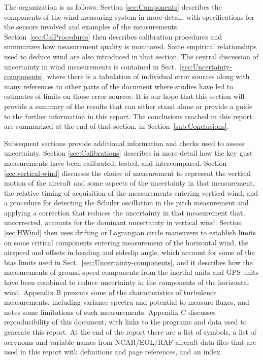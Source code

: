 \documentclass[12pt,twoside,english]{article}\usepackage[]{graphicx}\usepackage[]{color}
\let\OrgIndex\index
\renewcommand*{\index}[1]{\OrgIndex{#1}}
\begin{document}
The organization is as follows: Section \ref{sec:Components} describes the components of the wind-measuring system in more detail, with specifications for the sensors involved and examples of the measurements. Section~\ref{sec:CalProcedures} then describes calibration procedures and summarizes how measurement quality is monitored. Some empirical relationships used to deduce wind are also introduced in that section. The central discussion of uncertainty in wind measurements is contained in Sect.~\ref{sec:Uncertainty-components}, where there is a tabulation of individual error sources along with many references to other parts of the document where studies have led to estimates of limits on those error sources. It is our hope that this section will provide a summary of the results that can either stand alone or provide a guide to the further information in this report. The conclusions reached in this report are summarized at the end of that section, in Section~\ref{sub:Conclusions}.

Subsequent sections provide additional information and checks used to assess uncertainty. Section \ref{sec:Calibrations} describes in more detail how the key gust measurements have been calibrated, tested, and intercompared. Section \ref{sec:vertical-wind} discusses the choice of measurement to represent the vertical motion of the aircraft and some aspects of the uncertainty in that measurement, the relative timing of acquisition of the measurements entering vertical wind, and a procedure for detecting the Schuler oscillation in the pitch measurement and applying a correction that reduces the uncertainty in that measurement that, uncorrected, accounts for the dominant uncertainty in vertical wind. Section \ref{sec:HWind} then uses drifting or Lagrangian circle maneuvers to establish limits on some critical components entering measurement of the horizontal wind, the airspeed and offsets in heading and sideslip angle, which account for some of the bias limits used in Sect.~\ref{sec:Uncertainty-components}, and it describes how the measurements of ground-speed components from the inertial units and GPS units have been combined to reduce uncertainty in the components of the horizontal wind. Appendix B presents some of the characteristics of turbulence measurements, including variance spectra and potential to measure fluxes, and notes some limitations of such measurements. Appendix C discusses reproducibility of this document, with links to the programs and data used to generate this report. At the end of the report there are a list of symbols, a list of acrynoms and variable names from NCAR/EOL/RAF aircraft data files that are used in this report with definitions and page references, and an index. 
\end{document}
